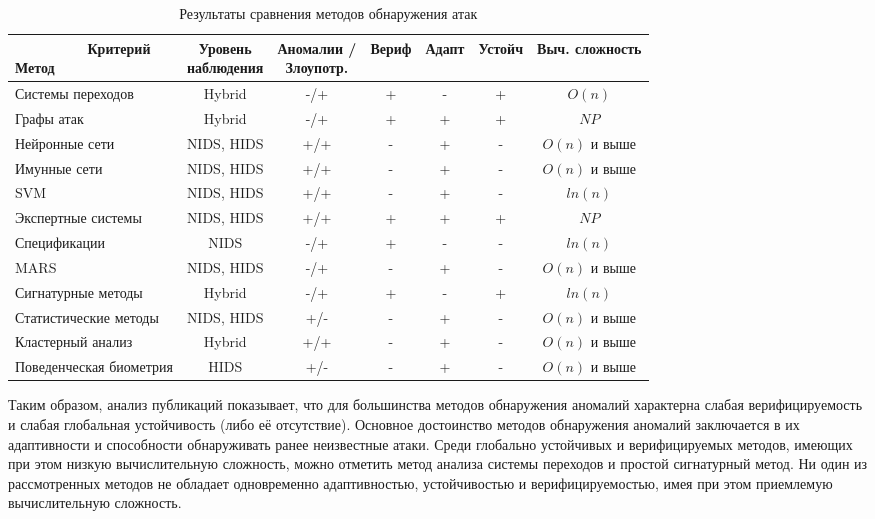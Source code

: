 {\footnotesize
\begin{table}[htb]
\centering
\caption{Результаты сравнения методов обнаружения атак}
\begin{tabular}{ | p{2.5cm} | c | c | c | c | c | c |}
	\hline
  \specialcell{~~~~~~~~~Критерий\\Метод} & \specialcell{Уровень\\наблюдения} & \specialcell{Аномалии / \\Злоупотр.} & Вериф & Адапт & Устойч & Выч. сложность \\ \hline
  Системы переходов & Hybrid & -/+ & + & - & + & $O(n)$ \\ \hline
  Графы атак & Hybrid & -/+ & + & + & + & $NP$ \\ \hline
  Нейронные сети & NIDS, HIDS & +/+ & - & + & - & $O(n)$ и выше \\ \hline
  Имунные сети & NIDS, HIDS & +/+ & - & + & - & $O(n)$ и выше \\ \hline
  SVM & NIDS, HIDS & +/+ & - & + & - & $ln(n)$\\ \hline
  Экспертные системы & NIDS, HIDS & +/+ & + & + & + & $NP$\\ \hline 
  Спецификации & NIDS & -/+ & + & - & - & $ln(n)$\\ \hline
  MARS & NIDS, HIDS & -/+ & - & + & - & $O(n)$ и выше \\ \hline
  Сигнатурные методы & Hybrid & -/+ & + & - & + & $ln(n)$ \\ \hline
  Статистические методы & NIDS, HIDS & +/- & - & + & - & $O(n)$ и выше \\ \hline
  Кластерный анализ & Hybrid & +/+ & - & + & - & $O(n)$ и выше \\ \hline
  Поведенческая биометрия & HIDS & +/- & - & + & - & $O(n)$ и выше \\ \hline
\end{tabular}
\end{table}
}

Таким образом, анализ публикаций показывает, что для большинства методов обнаружения аномалий характерна слабая верифицируемость и слабая глобальная устойчивость (либо её отсутствие). Основное достоинство методов обнаружения аномалий заключается в их адаптивности и способности обнаруживать ранее неизвестные атаки. Среди глобально устойчивых и верифицируемых методов, имеющих при этом низкую вычислительную сложность, можно отметить метод анализа системы переходов и простой сигнатурный метод. Ни один из рассмотренных методов не обладает одновременно адаптивностью, устойчивостью и верифицируемостью, имея при этом приемлемую вычислительную сложность.

